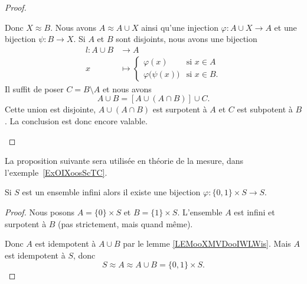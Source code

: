 \begin{proof}
\begin{subproof}
		Donc \( X\approx B\).
		Nous avons \( A\approx A\cup X\) ainsi qu'une injection \( \varphi\colon A\cup X\to A\) et une bijection \( \psi\colon B\to X\).
		Si \( A\) et \( B\) sont disjoints, nous avons une bijection
		\begin{equation}
			\begin{aligned}
				l\colon A\cup B & \to A                                                                   \\
				x               & \mapsto \begin{cases}
					                          \varphi(x)                 & \text{si }  x\in A \\
					                          \varphi\big( \psi(x) \big) & \text{si } x\in B.
				                          \end{cases}
			\end{aligned}
		\end{equation}
		Il suffit de poser \( C=B\setminus A\) et nous avons
		\begin{equation}
			A\cup B=[A\cup (A\cap B)]\cup C.
		\end{equation}
		Cette union est disjointe, \( A\cup(A\cap B)\) est surpotent à \( A\) et \( C\) est subpotent à \( B\). La conclusion est donc encore valable.
	\end{subproof}
\end{proof}

\begin{normaltext}	\label{NORMooBijectionApplicThMesure}
	La proposition suivante sera utilisée en théorie de la mesure, dans l'exemple~\ref{ExOIXoosScTC}.
\end{normaltext}

\begin{proposition} \label{PropVCSooMzmIX}
	Si \( S\) est un ensemble infini alors il existe une bijection \( \varphi\colon \{ 0,1 \}\times S\to S\).
\end{proposition}

\begin{proof}
	Nous posons \( A=\{ 0 \}\times S\) et \( B=\{ 1 \}\times S\). L'ensemble \( A\) est infini et surpotent à \( B\) (pas strictement, mais quand même).

	Donc \( A\) est idempotent à \( A\cup B\) par le lemme \ref{LEMooXMVDooIWLWis}. Mais \( A\) est idempotent à \( S\), donc
	\begin{equation}
		S\approx A \approx A\cup B=\{ 0,1 \}\times S.
	\end{equation}
\end{proof}

